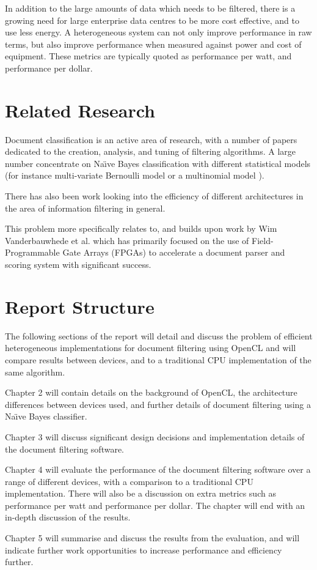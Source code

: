 In addition to the large amounts of data which needs to be filtered, there is a
growing need for large enterprise data centres to be more cost effective, and to
use less energy. A heterogeneous system can not only improve performance in raw
terms, but also improve performance when measured against power and cost of
equipment. These metrics are typically quoted as performance per watt, and
performance per dollar.

\section{Related Research}
\label{sec:relatedResearch}

Document classification is an active area of research, with a number of papers
dedicated to the creation, analysis, and tuning of filtering algorithms. A large
number concentrate on Na{\"{\i}}ve Bayes classification
\cite{androutsopoulos2000evaluation} \cite{androutsopoulos2000learning}  with
different statistical models (for instance multi-variate Bernoulli model or a
multinomial model \cite{Schneider:2003:CEM:1067807.1067848}
\cite{mccallum1998comparison}).

There has also been work looking into the efficiency of different architectures
in the area of information filtering \cite{chen2012invited}
\cite{he2013massively} in general.

This problem more specifically relates to, and builds upon work by Wim
Vanderbauwhede et al. which has primarily focused on the use of Field-
Programmable Gate Arrays (FPGAs) to accelerate a document parser and scoring
system \cite{vanderbauwhede2013high} \cite{HybridCPUFPGA}
\cite{chalamalasetti2012evaluating} with significant success.

\section{Report Structure}

The following sections of the report will detail and discuss the problem of
efficient heterogeneous implementations for document filtering using OpenCL and
will compare results between devices, and to a traditional CPU implementation of
the same algorithm.

Chapter 2 will contain details on the background of OpenCL, the architecture
differences between devices used, and further details of document filtering
using a Na{\"{\i}}ve Bayes classifier.

Chapter 3 will discuss significant design decisions and implementation details
of the document filtering software.

Chapter 4 will evaluate the performance of the document filtering software over
a range of different devices, with a comparison to a traditional CPU
implementation. There will also be a discussion on extra metrics such as
performance per watt and performance per dollar. The chapter will end with an
in-depth discussion of the results.

Chapter 5 will summarise and discuss the results from the evaluation, and will
indicate further work opportunities to increase performance and efficiency
further.
